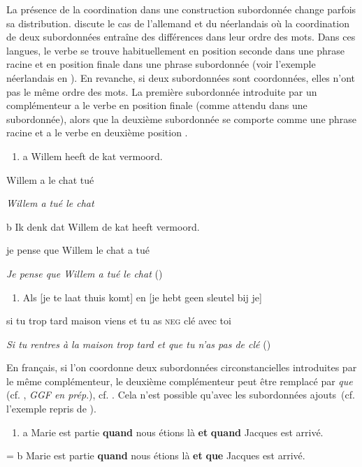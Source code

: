 La présence de la coordination dans une construction subordonnée change parfois sa distribution. \citet{Johannessen1998} discute le cas de l'allemand et du néerlandais où la coordination de deux subordonnées entraîne des différences dans leur ordre des mots. Dans ces langues, le verbe se trouve habituellement en position seconde dans une phrase racine et en position finale dans une phrase subordonnée (voir l'exemple néerlandais en ). En revanche, si deux subordonnées sont coordonnées, elles n'ont pas le même ordre des mots. La première subordonnée introduite par un complémenteur a le verbe en position finale (comme attendu dans une subordonnée), alors que la deuxième subordonnée se comporte comme une phrase racine et a le verbe en deuxième position .


\begin{enumerate}
\item \label{bkm:Ref301351743}a  Willem  heeft  de  kat  vermoord.


\end{enumerate}
Willem  a  le  chat  tué

{\itshape
Willem a tué le chat}

  b  Ik  denk  dat  Willem  de  kat  heeft  vermoord.

    je  pense  que  Willem  le  chat  a  tué

    \textit{Je pense que Willem a tué le chat          } (\citet[249]{Aarts2006})


\begin{enumerate}
\item \label{bkm:Ref301351983}Als  [je  te  laat  thuis  komt]  en  [je  hebt  geen  sleutel  bij  je] 


\end{enumerate}
  si  tu  trop  tard  maison  viens  et  tu  as  \textsc{neg}  clé  avec  toi

\textit{  Si tu rentres à la maison trop tard et que tu n'as pas de clé   } (\citet[40]{Johannessen1998})

En français, si l'on coordonne deux subordonnées circonstancielles introduites par le même complémenteur, le deuxième complémenteur peut être remplacé par \textit{que} (cf. \citet{Piot1993}, \textit{GGF en prép}.), cf. . Cela n'est possible qu'avec les subordonnées ajouts~(cf. l'exemple  repris de \citet{Piot1993}).


\begin{enumerate}
\item \label{bkm:Ref301352172}a  Marie est partie \textbf{quand} nous étions là \textbf{et} \textbf{quand} Jacques est arrivé.


\end{enumerate}
=  b  Marie est partie \textbf{quand} nous étions là \textbf{et} \textbf{que} Jacques est arrivé. 



